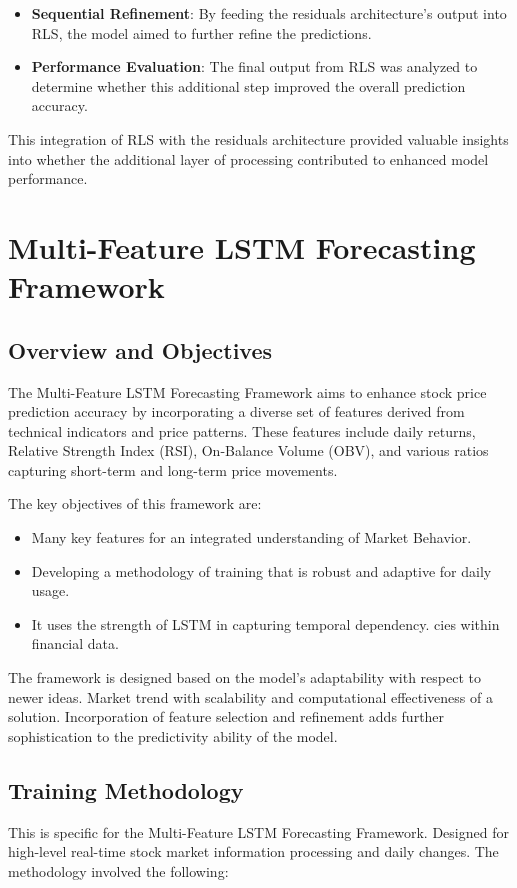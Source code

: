 \begin{itemize}
    \item \textbf{Sequential Refinement}: By feeding the residuals architecture's output into RLS, the model aimed to further refine the predictions.
    \item \textbf{Performance Evaluation}: The final output from RLS was analyzed to determine whether this additional step improved the overall prediction accuracy.
\end{itemize}

This integration of RLS with the residuals architecture provided valuable insights into whether the additional layer of processing contributed to enhanced model performance.

\section{Multi-Feature LSTM Forecasting Framework}
\subsection{Overview and Objectives}
The Multi-Feature LSTM Forecasting Framework aims to enhance stock price prediction accuracy by incorporating a diverse set of features derived from technical indicators and price patterns. These features include daily returns, Relative Strength Index (RSI), On-Balance Volume (OBV), and various ratios capturing short-term and long-term price movements. 

The key objectives of this framework are:
\begin{itemize}
    \item Many key features for an integrated understanding of
Market Behavior.
    \item Developing a methodology of training that is robust and adaptive for daily usage.
    \item It uses the strength of LSTM in capturing temporal dependency.
cies within financial data.
\end{itemize}

The framework is designed based on the model's adaptability with respect to newer ideas. Market trend with scalability and computational effectiveness of a solution.
Incorporation of feature selection and refinement adds further sophistication to the predictivity ability of the model.

\subsection{Training Methodology}
This is specific for the Multi-Feature LSTM Forecasting Framework. Designed for high-level real-time stock market information processing and daily changes. The methodology involved the following:
